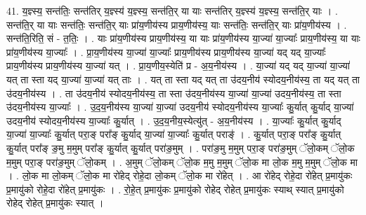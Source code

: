 \documentclass[17pt]{extarticle}
\begin{document}
41. य॒ज्ञ्स्य॒ सन्त॑तिः॒ सन्त॑तिर् य॒ज्ञ्स्य॑ य॒ज्ञ्स्य॒ सन्त॑ति॒र् या याः सन्त॑तिर् य॒ज्ञ्स्य॑ य॒ज्ञ्स्य॒ सन्त॑ति॒र् याः । . सन्त॑ति॒र् या याः सन्त॑तिः॒ सन्त॑ति॒र् याः प्रा॑य॒णीय॑स्य प्राय॒णीय॑स्य॒ याः सन्त॑तिः॒ सन्त॑ति॒र् याः प्रा॑य॒णीय॑स्य । . सन्त॑ति॒रिति॒ सं - त॒तिः॒ । . याः प्रा॑य॒णीय॑स्य प्राय॒णीय॑स्य॒ या याः प्रा॑य॒णीय॑स्य या॒ज्या॑ या॒ज्याः᳚ प्राय॒णीय॑स्य॒ या याः प्रा॑य॒णीय॑स्य या॒ज्याः᳚ । . प्रा॒य॒णीय॑स्य या॒ज्या॑ या॒ज्याः᳚ प्राय॒णीय॑स्य प्राय॒णीय॑स्य या॒ज्या॑ यद् यद् या॒ज्याः᳚ प्राय॒णीय॑स्य प्राय॒णीय॑स्य या॒ज्या॑ यत् । . प्रा॒य॒णीय॒स्येति॑ प्र - अ॒य॒नीय॑स्य । . या॒ज्या॑ यद् यद् या॒ज्या॑ या॒ज्या॑ यत् ता स्ता यद् या॒ज्या॑ या॒ज्या॑ यत् ताः । . यत् ता स्ता यद् यत् ता उ॑दय॒नीय॑ स्योदय॒नीय॑स्य॒ ता यद् यत् ता उ॑दय॒नीय॑स्य । . ता उ॑दय॒नीय॑ स्योदय॒नीय॑स्य॒ ता स्ता उ॑दय॒नीय॑स्य या॒ज्या॑ या॒ज्या॑ उदय॒नीय॑स्य॒ ता स्ता उ॑दय॒नीय॑स्य या॒ज्याः᳚ । . उ॒द॒य॒नीय॑स्य या॒ज्या॑ या॒ज्या॑ उदय॒नीय॑ स्योदय॒नीय॑स्य या॒ज्याः᳚ कु॒र्यात् कु॒र्याद् या॒ज्या॑ उदय॒नीय॑
स्योदय॒नीय॑स्य या॒ज्याः᳚ कु॒र्यात् । . उ॒द॒य॒नीय॒स्येत्यु॑त् - अ॒य॒नीय॑स्य । . या॒ज्याः᳚ कु॒र्यात् कु॒र्याद् या॒ज्या॑ या॒ज्याः᳚ कु॒र्यात् परा॒ङ् परा᳚ङ् कु॒र्याद् या॒ज्या॑ या॒ज्याः᳚ कु॒र्यात् पराङ्॑ । . कु॒र्यात् परा॒ङ् परा᳚ङ् कु॒र्यात् कु॒र्यात् परा᳚ङ् ङ॒मु म॒मुम् परा᳚ङ् कु॒र्यात् कु॒र्यात् परा॑ङ॒मुम् । . परा॑ङ॒मु म॒मुम् परा॒ङ् परा॑ङ॒मुम् ॅलो॒कम् ॅलो॒क म॒मुम् परा॒ङ् परा॑ङ॒मुम् ॅलो॒कम् । . अ॒मुम् ॅलो॒कम् ॅलो॒क म॒मु म॒मुम् ॅलो॒क मा लो॒क म॒मु म॒मुम् ॅलो॒क मा । . लो॒क मा लो॒कम् ॅलो॒क मा रो॑हेद् रोहे॒दा लो॒कम् ॅलो॒क मा रो॑हेत् । . आ रो॑हेद् रोहे॒दा रो॑हेत् प्र॒मायु॑कः प्र॒मायु॑को रोहे॒दा रो॑हेत् प्र॒मायु॑कः । . रो॒हे॒त् प्र॒मायु॑कः प्र॒मायु॑को रोहेद् रोहेत् प्र॒मायु॑कः स्याथ् स्यात् प्र॒मायु॑को रोहेद् रोहेत् प्र॒मायु॑कः स्यात् । \newline
\end{document}
